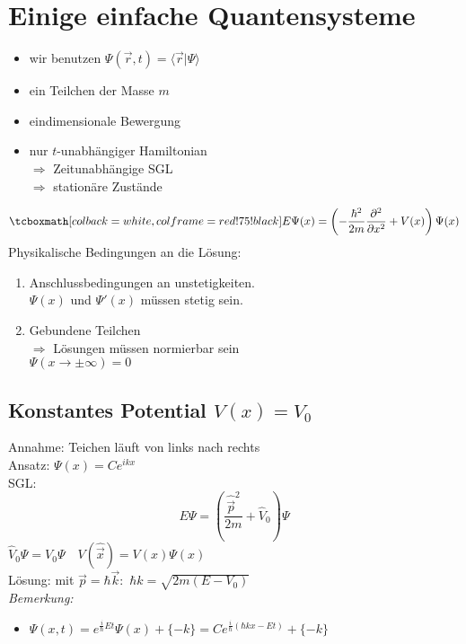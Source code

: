 \section{Einige einfache Quantensysteme}

\begin{itemize}
	\item wir benutzen $ \Psi(\vec{r},t) = \langle \vec{r}|\Psi \rangle $
	\item ein Teilchen der Masse $ m $
	\item eindimensionale Bewergung
	\item nur $ t $-unabhängiger Hamiltonian\\
	$ \Rightarrow $ Zeitunabhängige SGL\\
	$ \Rightarrow $ stationäre Zustände
\end{itemize}
\begin{equation*}
\rmbox{ E \Psi(x) = \left(-\frac{\hbar^2}{2m} \prt{^2}{x^2} + V(x)\right) \Psi(x) }
\end{equation*}
Physikalische Bedingungen an die Lösung:
\begin{enumerate}[(1)]
	\item Anschlussbedingungen an unstetigkeiten.\\
	$ \Psi(x) $ und $ \Psi'(x) $ müssen stetig sein.
	\item Gebundene Teilchen\\
	$ \Rightarrow $ Lösungen müssen normierbar sein\\
	$ \Psi(x \to \pm \infty) = 0 $
\end{enumerate}

\subsection{Konstantes Potential \texorpdfstring{$ V(x) = V_0 $}{V(x) = V0}}

Annahme: Teichen läuft von links nach rechts\\
Ansatz: $ \Psi(x) = C e^{i k x} $\\
SGL:
\begin{equation*}
E \Psi = \left(\frac{\hat{\vec{p}}^2}{2m} + \hat{V}_0\right) \Psi
\end{equation*}
$ \hat{V}_0 \Psi = V_0 \Psi \quad V(\hat{\vec{x}}) = V(x) \Psi(x) $\\
Lösung: mit $ \vec{p} = \hbar \vec{k} : $ $ \hbar k = \sqrt{2 m (E - V_0)} $\\
\emph{Bemerkung:}
\begin{itemize}
	\item $ \Psi(x,t) = e^{\frac{i}{\hbar} Et} \Psi(x) + \{ - k \} = C e^{\frac{i}{\hbar} (\hbar k x - Et)} + \{ - k \} $
\end{itemize}

